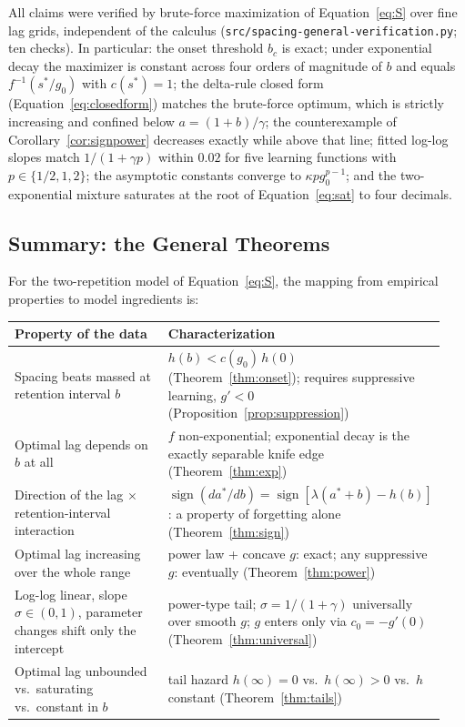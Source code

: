 \documentclass[man, 12pt, floatsintext]{apa6}
\theoremstyle{definition}
\theoremstyle{remark}
\begin{document}
All claims were verified by brute-force maximization of Equation~\ref{eq:S} over fine lag grids, independent of the calculus (\texttt{src/spacing-general-verification.py}; ten checks). In particular: the onset threshold $b_c$ is exact; under exponential decay the maximizer is constant across four orders of magnitude of $b$ and equals $f^{-1}(s^*/g_0)$ with $c(s^*)=1$; the delta-rule closed form (Equation~\ref{eq:closedform}) matches the brute-force optimum, which is strictly increasing and confined below $a=(1+b)/\gamma$; the counterexample of Corollary~\ref{cor:signpower} decreases exactly while above that line; fitted log-log slopes match $1/(1+\gamma p)$ within $0.02$ for five learning functions with $p \in \{1/2, 1, 2\}$; the asymptotic constants converge to $\kappa p g_0^{p-1}$; and the two-exponential mixture saturates at the root of Equation~\ref{eq:sat} to four decimals.

\subsection{Summary: the General Theorems}

For the two-repetition model of Equation~\ref{eq:S}, the mapping from empirical properties to model ingredients is:
\begin{center}
\begin{tabular}{p{0.44\linewidth} p{0.5\linewidth}}
\hline
\textbf{Property of the data} & \textbf{Characterization} \\
\hline
Spacing beats massed at retention interval $b$ & $h(b) < c(g_0)\, h(0)$ (Theorem~\ref{thm:onset}); requires suppressive learning, $g' < 0$ (Proposition~\ref{prop:suppression}) \\
Optimal lag depends on $b$ at all & $f$ non-exponential; exponential decay is the exactly separable knife edge (Theorem~\ref{thm:exp}) \\
Direction of the lag $\times$ retention-interval interaction & $\operatorname{sign}(da^*/db) = \operatorname{sign}[\lambda(a^*+b) - h(b)]$: a property of forgetting alone (Theorem~\ref{thm:sign}) \\
Optimal lag increasing over the whole range & power law + concave $g$: exact; any suppressive $g$: eventually (Theorem~\ref{thm:power}) \\
Log-log linear, slope $\sigma \in (0,1)$, parameter changes shift only the intercept & power-type tail; $\sigma = 1/(1+\gamma)$ universally over smooth $g$; $g$ enters only via $c_0 = -g'(0)$ (Theorem~\ref{thm:universal}) \\
Optimal lag unbounded vs.\ saturating vs.\ constant in $b$ & tail hazard $h(\infty) = 0$ vs.\ $h(\infty) > 0$ vs.\ $h$ constant (Theorem~\ref{thm:tails}) \\
\hline
\end{tabular}
\end{center}
\end{document}
